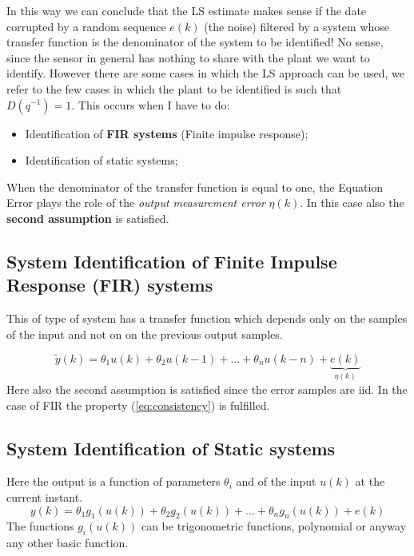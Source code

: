 \noindent
In this way we can conclude that the LS estimate makes sense if the date corrupted by a random sequence $e(k)$ (the noise) filtered by a system whose transfer function is the denominator of the system to be identified! No sense, since the sensor in general has nothing to share with the plant we want to identify. 
However there are some cases in which the LS approach can be used, we refer to the few cases in which the plant to be identified is such that $D(q^{-1})=1$. This occurs when I have to do:
\begin{itemize}
    \itemsep-0.2em
    \item Identification of \textbf{FIR systems} (Finite impulse response); 
    \item Identification of static systems;
\end{itemize}
\noindent
When the denominator of the transfer function is equal to one, the Equation Error plays the role of the \textit{output measurement error} $\eta(k)$. In this case also the \textbf{second assumption} is satisfied.


\subsection{System Identification of Finite Impulse Response (FIR) systems}
This of type of system has a transfer function which depends only on the samples of the input and not on on the previous output samples.

\begin{equation}
    \tilde{y}(k)=\theta_1{u(k)}+\theta_2{u(k-1)}+...+\theta_n{u(k-n)}+
    \underbrace{e(k)}_{\eta(k)}
\end{equation}
Here also the second assumption is satisfied since the error samples are iid. In the case of FIR the property (\ref{eq:consistency}) is fulfilled.

\subsection{System Identification of Static systems}
Here the output is a function of parameters $\theta_i$ and of the input $u(k)$ at the current instant.
\begin{equation}
    y(k)=\theta_1{g_1({u(k)})} + 
    \theta_2{g_2({u(k)})} + ... +
    \theta_n{g_n({u(k)})} + e(k)
\end{equation}
The functions $g_i(u(k))$ can be trigonometric functions, polynomial or anyway any other basic function.\\

